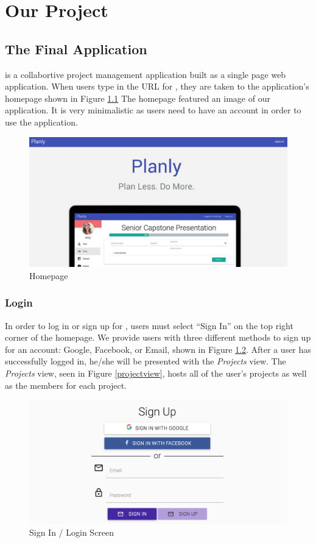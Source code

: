 \chapter{Our Project}

\section{The Final Application}
\projectTitle{} is a collabortive project management application built as a single page web application. When users type in the URL for \projectTitle{}, they are taken to the application's homepage shown in Figure \ref{homepage} The homepage featured an image of our application. It is very minimalistic as users need to have an account in order to use the application.

\begin{figure}[ht]
\centering
\includegraphics[width=\textwidth]{figure41.png}
\caption{Homepage}
\label{homepage}
\end{figure}
\FloatBarrier

\subsection{Login}
In order to log in or sign up for \projectTitle{}, users must select ``Sign In'' on the top right corner of the homepage. We provide users with three different methods to sign up for an account: Google, Facebook, or Email, shown in Figure \ref{signin}. After a user has successfully logged in, he/she will be presented with the \emph{Projects} view. The \emph{Projects} view, seen in Figure \ref{projectview}, hosts all of the user's projects as well as the members for each project. 

\begin{figure}[ht]
\centering
\includegraphics[width=\textwidth]{figure42.png}
\caption{Sign In / Login Screen}
\label{signin}
\end{figure}
\FloatBarrier

